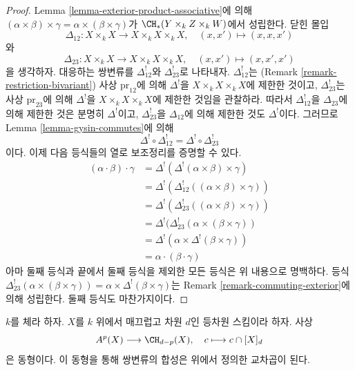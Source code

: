 \begin{proof}
Lemma \ref{lemma-exterior-product-associative}에 의해
$(\alpha \times \beta) \times \gamma =
\alpha \times (\beta \times \gamma)$가
$\CH_*(Y \times_k Z \times_k W)$에서 성립한다. 닫힌 몰입
$$
\Delta_{12} : X \times_k X \longrightarrow X \times_k X \times_k X,
\quad (x, x') \mapsto (x, x, x')
$$
와
$$
\Delta_{23} : X \times_k X \longrightarrow X \times_k X \times_k X,
\quad (x, x') \mapsto (x, x', x')
$$
을 생각하자. 대응하는 쌍변류를 $\Delta_{12}^!$와
$\Delta_{23}^!$로 나타내자. $\Delta_{12}^!$는
(Remark \ref{remark-restriction-bivariant}) 사상 $\text{pr}_{12}$에
의해 $\Delta^!$을 $X \times_k X \times_k X$에 제한한 것이고,
$\Delta_{23}^!$는 사상 $\text{pr}_{23}$에 의해 $\Delta^!$을
$X \times_k X \times_k X$에 제한한 것임을 관찰하라. 따라서
$\Delta_{12}^!$을 $\Delta_{23}$에 의해 제한한 것은 분명히
$\Delta^!$이고, $\Delta_{23}^!$을 $\Delta_{12}$에 의해 제한한 것도
$\Delta^!$이다. 그러므로 Lemma \ref{lemma-gysin-commutes}에 의해
$$
\Delta^! \circ \Delta_{12}^! =
\Delta^! \circ \Delta_{23}^! 
$$
이다. 이제 다음 등식들의 열로 보조정리를 증명할 수 있다.
\begin{align*}
(\alpha \cdot \beta) \cdot \gamma
& =
\Delta^!(\Delta^!(\alpha \times \beta) \times \gamma) \\
& =
\Delta^!(\Delta_{12}^!((\alpha \times \beta) \times \gamma)) \\
& =
\Delta^!(\Delta_{23}^!((\alpha \times \beta) \times \gamma)) \\
& =
\Delta^!(\Delta_{23}^!(\alpha \times (\beta \times \gamma)) \\
& =
\Delta^!(\alpha \times \Delta^!(\beta \times \gamma)) \\
& =
\alpha \cdot (\beta \cdot \gamma)
\end{align*}
아마 둘째 등식과 끝에서 둘째 등식을 제외한 모든 등식은 위 내용으로
명백하다. 등식
$\Delta_{23}^!(\alpha \times (\beta \times \gamma)) =
\alpha \times \Delta^!(\beta \times \gamma)$는 Remark
\ref{remark-commuting-exterior}에 의해 성립한다. 둘째 등식도
마찬가지이다.
\end{proof}

\begin{lemma}
\label{lemma-identify-chow-for-smooth}
$k$를 체라 하자. $X$를 $k$ 위에서 매끄럽고 차원 $d$인 등차원
스킴이라 하자. 사상
$$
A^p(X) \longrightarrow \CH_{d - p}(X),\quad
c \longmapsto c \cap [X]_d
$$
은 동형이다. 이 동형을 통해 쌍변류의 합성은 위에서 정의한 교차곱이
된다.
\end{lemma}

